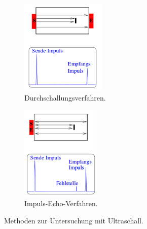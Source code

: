  \begin{figure}
     \centering
     \begin{subfigure}{0.48\textwidth}
         \centering
         \includegraphics[height=4.5cm]{ressources/dv.png}
         \caption[]%
         {{\small Durchschallungsverfahren.}}
         \label{fig:dv}
     \end{subfigure}
     \begin{subfigure}{0.48\textwidth}
         \centering
         \includegraphics[height=4.5cm]{ressources/ei.png}
         \caption[]%
         {{\small Impuls-Echo-Verfahren.}}
         \label{fig:ie}
     \end{subfigure}
     \caption[]
     {Methoden zur Untersuchung mit Ultraschall. \cite{sample}}
  \end{figure}
